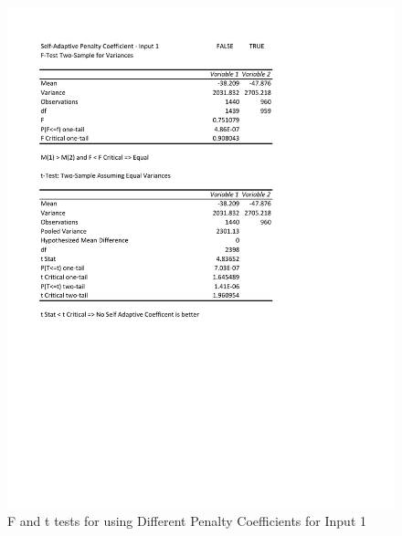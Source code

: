 \documentclass[times]{article}
\begin{document}
	\begin{figure}
		\caption{F and t tests for using Different Penalty Coefficients for Input 1}
		\label{fig:coeff1}
		\includegraphics[width=\textwidth]{./t_test/S-APenaltyCoeff1}
	\end{figure}
\end{document}
